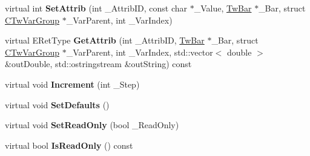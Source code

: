 \begin{DoxyCompactItemize}
\item 
\hypertarget{struct_c_tw_var_atom_a04a0613fa9850b22d703fa992ca88f92}{virtual int {\bfseries Set\+Attrib} (int \+\_\+\+Attrib\+I\+D, const char $\ast$\+\_\+\+Value, \hyperlink{struct_c_tw_bar}{Tw\+Bar} $\ast$\+\_\+\+Bar, struct \hyperlink{struct_c_tw_var_group}{C\+Tw\+Var\+Group} $\ast$\+\_\+\+Var\+Parent, int \+\_\+\+Var\+Index)}\label{struct_c_tw_var_atom_a04a0613fa9850b22d703fa992ca88f92}

\item 
\hypertarget{struct_c_tw_var_atom_a84d36fda7ad92627203dbdd830eca669}{virtual E\+Ret\+Type {\bfseries Get\+Attrib} (int \+\_\+\+Attrib\+I\+D, \hyperlink{struct_c_tw_bar}{Tw\+Bar} $\ast$\+\_\+\+Bar, struct \hyperlink{struct_c_tw_var_group}{C\+Tw\+Var\+Group} $\ast$\+\_\+\+Var\+Parent, int \+\_\+\+Var\+Index, std\+::vector$<$ double $>$ \&out\+Double, std\+::ostringstream \&out\+String) const }\label{struct_c_tw_var_atom_a84d36fda7ad92627203dbdd830eca669}

\item 
\hypertarget{struct_c_tw_var_atom_a2f25147071d74548711eb37f380fb155}{virtual void {\bfseries Increment} (int \+\_\+\+Step)}\label{struct_c_tw_var_atom_a2f25147071d74548711eb37f380fb155}

\item 
\hypertarget{struct_c_tw_var_atom_af66241337d707c487d4490d36e9720fe}{virtual void {\bfseries Set\+Defaults} ()}\label{struct_c_tw_var_atom_af66241337d707c487d4490d36e9720fe}

\item 
\hypertarget{struct_c_tw_var_atom_ae59f4bd13f35a1c4d46ccf5c5ec72199}{virtual void {\bfseries Set\+Read\+Only} (bool \+\_\+\+Read\+Only)}\label{struct_c_tw_var_atom_ae59f4bd13f35a1c4d46ccf5c5ec72199}

\item 
\hypertarget{struct_c_tw_var_atom_a91472b6b8f1f6280278ccde9c5397280}{virtual bool {\bfseries Is\+Read\+Only} () const }\label{struct_c_tw_var_atom_a91472b6b8f1f6280278ccde9c5397280}

\end{DoxyCompactItemize}
